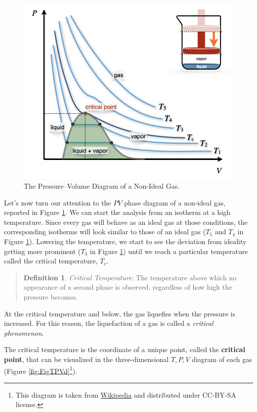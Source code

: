\documentclass[
  9pt,
]{extbook}
\theoremstyle{definition}
\newtheorem{definition}{Definition}[chapter]
\theoremstyle{definition}
\theoremstyle{definition}
\theoremstyle{remark}
\begin{document}
\begin{figure}

{\centering \includegraphics[width=0.6\linewidth]{./img/OEP_Figures.014} 

}

\caption{The Pressure–Volume Diagram of a Non-Ideal Gas.}\label{fig:FigPVni}
\end{figure}

Let's now turn our attention to the \(PV\) phase diagram of a non-ideal gas, reported in Figure \ref{fig:FigPVni}. We can start the analysis from an isotherm at a high temperature. Since every gas will behave as an ideal gas at those conditions, the corresponding isotherms will look similar to those of an ideal gas (\(T_5\) and \(T_4\) in Figure \ref{fig:FigPVni}). Lowering the temperature, we start to see the deviation from ideality getting more prominent (\(T_3\) in Figure \ref{fig:FigPVni}) until we reach a particular temperature called the critical temperature, \(T_c\).

\begin{quote}
\begin{definition}
\protect\hypertarget{def:criticalT}{}{\label{def:criticalT} }\emph{Critical Temperature:} The temperature above which no appearance of a second phase is observed, regardless of how high the pressure becomes.
\end{definition}
\end{quote}

At the critical temperature and below, the gas liquefies when the pressure is increased. For this reason, the liquefaction of a gas is called a \emph{critical phenomenon}.

The critical temperature is the coordinate of a unique point, called the \textbf{critical point}, that can be visualized in the three-dimensional \(T,P,V\) diagram of each gas (Figure \ref{fig:FigTPVd}\footnote{This diagram is taken from \href{https://en.wikipedia.org}{Wikipedia} and distributed under CC-BY-SA license.}).
\end{document}
